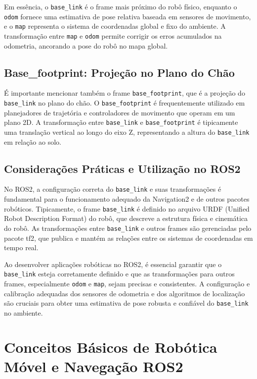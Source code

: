 Em essência, o \texttt{base\_link} é o frame mais próximo do robô físico,
enquanto o \texttt{odom} fornece uma estimativa de pose relativa baseada em
sensores de movimento, e o \texttt{map} representa o sistema de coordenadas
global e fixo do ambiente. A transformação entre \texttt{map} e \texttt{odom}
permite corrigir os erros acumulados na odometria, ancorando a pose do robô no
mapa global.

\subsection{Base\_footprint: Projeção no Plano do Chão}

É importante mencionar também o frame \texttt{base\_footprint}, que é a projeção do \texttt{base\_link} no plano do chão. O \texttt{base\_footprint} é frequentemente utilizado em planejadores de trajetória e controladores de movimento que operam em um plano 2D. A transformação entre \texttt{base\_link} e \texttt{base\_footprint} é tipicamente uma translação vertical ao longo do eixo Z, representando a altura do \texttt{base\_link} em relação ao solo.

\subsection{Considerações Práticas e Utilização no ROS2}

No ROS2, a configuração correta do \texttt{base\_link} e suas transformações é
fundamental para o funcionamento adequado da Navigation2 e de outros pacotes
robóticos. Tipicamente, o frame \texttt{base\_link} é definido no arquivo URDF
(Unified Robot Description Format) do robô, que descreve a estrutura física e
cinemática do robô. As transformações entre \texttt{base\_link} e outros frames
são gerenciadas pelo pacote tf2, que publica e mantém as relações entre os
sistemas de coordenadas em tempo real.

Ao desenvolver aplicações robóticas no ROS2, é essencial garantir que o
\texttt{base\_link} esteja corretamente definido e que as transformações para
outros frames, especialmente \texttt{odom} e \texttt{map}, sejam precisas e
consistentes. A configuração e calibração adequadas dos sensores de odometria e
dos algoritmos de localização são cruciais para obter uma estimativa de pose
robusta e confiável do \texttt{base\_link} no ambiente.

\section{Conceitos Básicos de Robótica Móvel e Navegação ROS2}

